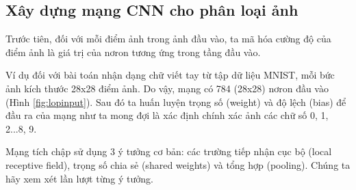 \subsection{Xây dựng mạng CNN cho phân loại ảnh}
Trước tiên, đối với mỗi điểm ảnh trong ảnh đầu vào, ta mã hóa cường độ của 
điểm ảnh là giá trị của nơron tương ứng trong tầng đầu vào.
 
Ví dụ đối với bài toán nhận dạng chữ viết tay từ tập dữ liệu MNIST, mỗi bức 
ảnh kích thước 28x28 điểm ảnh. Do vậy, mạng có 784 (28x28) nơron đầu vào (Hình 
\ref{fig:lopinput}). Sau đó ta huấn luyện trọng số (weight) và độ lệch (bias) để đầu ra của mạng 
như ta mong đợi là xác định chính xác ảnh các chữ số 0, 1, 2...8, 9.

Mạng tích chập sử dụng 3 ý tưởng cơ bản: các trường tiếp nhận cục bộ (local 
receptive field), trọng số chia sẻ (shared weights) và tổng hợp (pooling). Chúng ta 
hãy xem xét lần lượt từng ý tưởng.

